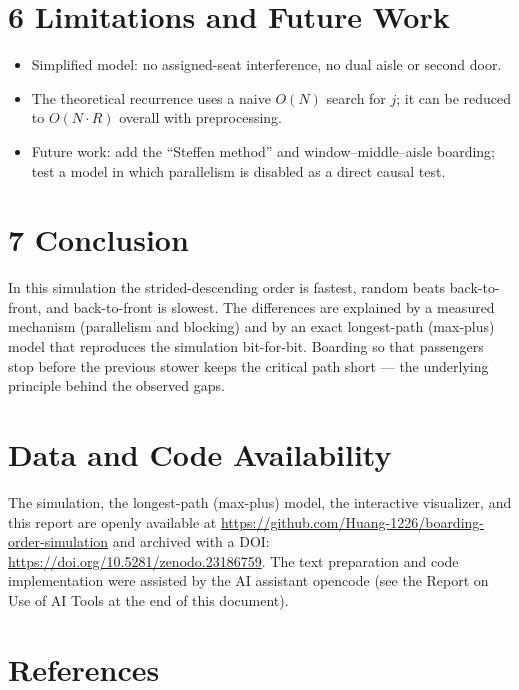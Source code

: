 \documentclass[
  11pt,
  a4paper]{article}
\providecommand{\tightlist}{%
  \setlength{\itemsep}{0pt}\setlength{\parskip}{0pt}}
\begin{document}
\section{6 Limitations and Future
Work}\label{limitations-and-future-work}

\begin{itemize}
\tightlist
\item
  Simplified model: no assigned-seat interference, no dual aisle or
  second door.
\item
  The theoretical recurrence uses a naive \(O(N)\) search for \(j\); it
  can be reduced to \(O(N\cdot R)\) overall with preprocessing.
\item
  Future work: add the ``Steffen method'' and window--middle--aisle
  boarding; test a model in which parallelism is disabled as a direct
  causal test.
\end{itemize}

\section{7 Conclusion}\label{conclusion}

In this simulation the strided-descending order is fastest, random beats
back-to-front, and back-to-front is slowest. The differences are
explained by a measured mechanism (parallelism and blocking) and by an
exact longest-path (max-plus) model that reproduces the simulation
bit-for-bit. Boarding so that passengers stop before the previous stower
keeps the critical path short --- the underlying principle behind the
observed gaps.

\section{Data and Code Availability}\label{data-and-code-availability}

The simulation, the longest-path (max-plus) model, the interactive
visualizer, and this report are openly available at
\url{https://github.com/Huang-1226/boarding-order-simulation} and
archived with a DOI: \url{https://doi.org/10.5281/zenodo.23186759}. The
text preparation and code implementation were assisted by the AI
assistant opencode (see the Report on Use of AI Tools at the end of this
document).

\section{References}\label{references}
\end{document}
